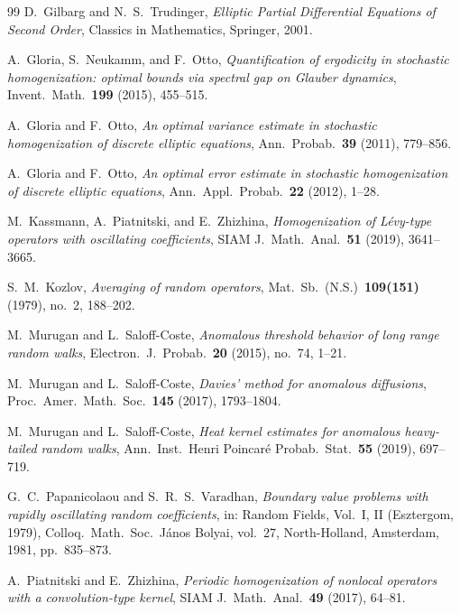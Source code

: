 \documentclass[11pt]{amsart}
\theoremstyle{plain}
\theoremstyle{definition}
\theoremstyle{remark}
\begin{document}
\begin{thebibliography}{99}
		D.~Gilbarg and N.~S.~Trudinger,
		\emph{Elliptic Partial Differential Equations of Second Order},
		Classics in Mathematics, Springer, 2001.
		
		A.~Gloria, S.~Neukamm, and F.~Otto,
		\emph{Quantification of ergodicity in stochastic homogenization: optimal bounds via spectral gap on Glauber dynamics},
		Invent.\ Math.\ \textbf{199} (2015), 455--515.
		
		A.~Gloria and F.~Otto,
		\emph{An optimal variance estimate in stochastic homogenization of discrete elliptic equations},
		Ann.\ Probab.\ \textbf{39} (2011), 779--856.
		
		A.~Gloria and F.~Otto,
		\emph{An optimal error estimate in stochastic homogenization of discrete elliptic equations},
		Ann.\ Appl.\ Probab.\ \textbf{22} (2012), 1--28.
		
		M.~Kassmann, A.~Piatnitski, and E.~Zhizhina,
		\emph{Homogenization of L\'evy-type operators with oscillating coefficients},
		SIAM J.\ Math.\ Anal.\ \textbf{51} (2019), 3641--3665.
		
		S.~M.~Kozlov,
		\emph{Averaging of random operators},
		Mat.\ Sb.\ (N.S.)\ \textbf{109(151)} (1979), no.~2, 188--202.
		
		M.~Murugan and L.~Saloff-Coste,
		\emph{Anomalous threshold behavior of long range random walks},
		Electron.\ J.\ Probab.\ \textbf{20} (2015), no.~74, 1--21.
		
		M.~Murugan and L.~Saloff-Coste,
		\emph{Davies' method for anomalous diffusions},
		Proc.\ Amer.\ Math.\ Soc.\ \textbf{145} (2017), 1793--1804.
		
		M.~Murugan and L.~Saloff-Coste,
		\emph{Heat kernel estimates for anomalous heavy-tailed random walks},
		Ann.\ Inst.\ Henri Poincar\'e Probab.\ Stat.\ \textbf{55} (2019), 697--719.
		
		G.~C.~Papanicolaou and S.~R.~S.~Varadhan,
		\emph{Boundary value problems with rapidly oscillating random coefficients},
		in: Random Fields, Vol.~I, II (Esztergom, 1979), Colloq.\ Math.\ Soc.\ J\'anos Bolyai, vol.~27, North-Holland, Amsterdam, 1981, pp.~835--873.
		
		A.~Piatnitski and E.~Zhizhina,
		\emph{Periodic homogenization of nonlocal operators with a convolution-type kernel},
		SIAM J.\ Math.\ Anal.\ \textbf{49} (2017), 64--81.
		

\end{thebibliography}
\end{document}
